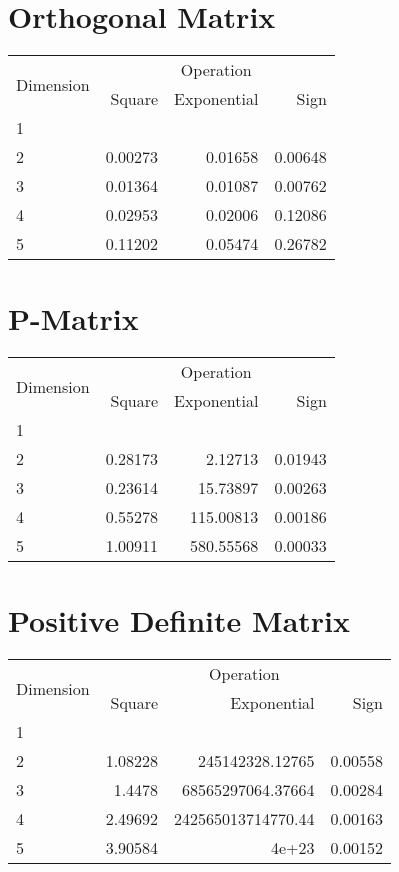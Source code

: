 \documentclass{article}
\begin{document}
\section{Orthogonal Matrix}
\begin{tabular}{@{}lrrr@{}}
\toprule
\multirow{2}{*}{Dimension} & \multicolumn{3}{c}{Operation} \\
\cmidrule(l){2-4}
& Square & Exponential & Sign \\
\midrule
1 & & & \\
2 & 0.00273 & 0.01658 & 0.00648 \\
3 & 0.01364 & 0.01087 & 0.00762 \\
4 & 0.02953 & 0.02006 & 0.12086 \\
5 & 0.11202 & 0.05474 & 0.26782 \\
\bottomrule
\end{tabular}

\section{P-Matrix}
\begin{tabular}{@{}lrrr@{}}
\toprule
\multirow{2}{*}{Dimension} & \multicolumn{3}{c}{Operation} \\
\cmidrule(l){2-4}
& Square & Exponential & Sign \\
\midrule
1 & & & \\
2 & 0.28173 & 2.12713 & 0.01943 \\
3 & 0.23614 & 15.73897 & 0.00263 \\
4 & 0.55278 & 115.00813 & 0.00186 \\
5 & 1.00911 & 580.55568 & 0.00033 \\
\bottomrule
\end{tabular}

\section{Positive Definite Matrix}
\begin{tabular}{@{}lrrr@{}}
\toprule
\multirow{2}{*}{Dimension} & \multicolumn{3}{c}{Operation} \\
\cmidrule(l){2-4}
& Square & Exponential & Sign \\
\midrule
1 & & & \\
2 & 1.08228 & 245142328.12765 & 0.00558 \\
3 & 1.4478 & 68565297064.37664 & 0.00284 \\
4 & 2.49692 & 242565013714770.44 & 0.00163 \\
5 & 3.90584 & 4e+23 & 0.00152 \\
\bottomrule
\end{tabular}
\end{document}
